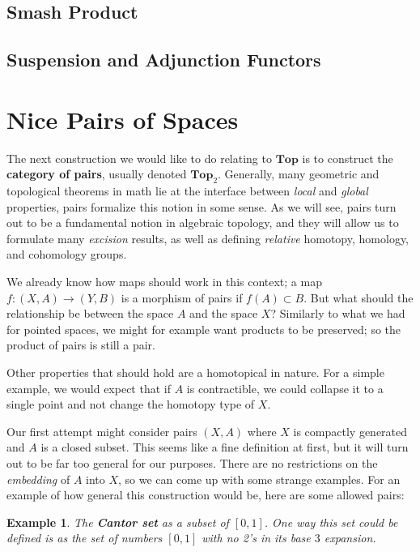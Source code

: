 \documentclass[12pt]{article}
\newtheorem{example}[definition]{Example}
\begin{document}
\subsection{Smash Product}

\subsection{Suspension and Adjunction Functors}

\section{Nice Pairs of Spaces}

The next construction we would like to do relating to $\mathbf{Top}$ is to construct the \textbf{category of pairs}, usually denoted $\mathbf{Top}_2$. Generally, many geometric and topological theorems in math lie at the interface between \emph{local} and \emph{global} properties, pairs formalize this notion in some sense.
As we will see, pairs turn out to be a fundamental notion in algebraic topology, and they will allow us to formulate many \emph{excision} results, as well as defining \emph{relative} homotopy, homology, and cohomology groups.

We already know how maps should work in this context; a map $f : (X, A) \to (Y, B)$ is a morphism of pairs if $f(A)\subset B$. But what should the relationship be between the space $A$ and the space $X$? Similarly to what we had for pointed spaces, we might for example want products to be preserved; so the product of pairs is still a pair. 

Other properties that should hold are a homotopical in nature. For a simple example, we would expect that if $A$ is contractible, we could collapse it to a single point and not change the homotopy type of $X$.

Our first attempt might consider pairs $(X,A)$ where $X$ is compactly generated and $A$ is a closed subset. This seems like a fine definition at first, but it will turn out to be far too general for our purposes. There are no restrictions on the \emph{embedding} of $A$ into $X$, so we can come up with some strange examples. For an example of how general this construction would be, here are some allowed pairs:

\begin{example}
  The \textbf{Cantor set} as a subset of $[0,1]$. One way this set could be defined is as the set of numbers $[0,1]$ with no 2's in its base $3$ expansion.
\end{example}
\end{document}
